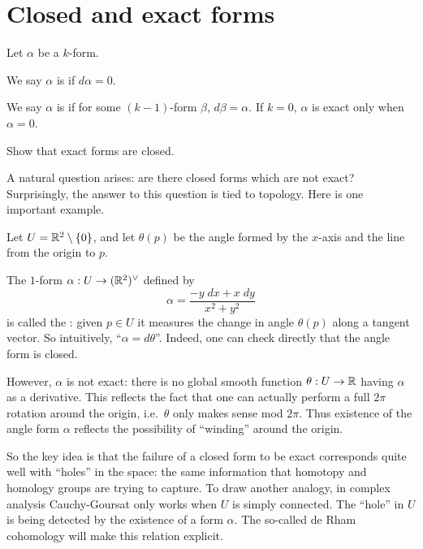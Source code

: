 \section{Closed and exact forms}
Let $\alpha$ be a $k$-form.
\begin{definition}
	We say $\alpha$ is  if $d\alpha = 0$.
\end{definition}
\begin{definition}
	We say $\alpha$ is  if for some $(k-1)$-form $\beta$,
	$d\beta = \alpha$.  If $k = 0$, $\alpha$ is exact only when $\alpha = 0$.
\end{definition}
\begin{ques}
	Show that exact forms are closed.
\end{ques}

A natural question arises: are there closed forms
which are not exact?
Surprisingly, the answer to this question is tied to topology.
Here is one important example.

\begin{example}
	\label{ex:angle_form}
	Let $U = \mathbb R^2 \setminus \{0\}$,
	and let $\theta(p)$ be the angle formed by the $x$-axis
	and the line from the origin to $p$.

	The $1$-form $\alpha : U \to (\mathbb R^2)^\vee$ defined by
	\[ \alpha = \frac{-y \; dx + x \; dy}{x^2+y^2} \]
	is called the :
	given $p \in U$ it measures the change in angle $\theta(p)$
	along a tangent vector.
	So intuitively, ``$\alpha = d\theta$''.
	Indeed, one can check directly that the angle form is closed.

	However, $\alpha$ is not exact: there is no global smooth
	function $\theta : U \to \mathbb R$ having $\alpha$ as a derivative.
	This reflects the fact that one can actually perform
	a full $2\pi$ rotation around the origin, i.e.\ $\theta$
	only makes sense mod $2\pi$.
	Thus existence of the angle form $\alpha$ reflects
	the possibility of ``winding'' around the origin.
\end{example}

So the key idea is that the failure of a closed form to be exact
corresponds quite well with ``holes'' in the space:
the same information that homotopy and homology groups are trying to capture.
To draw another analogy, in complex analysis Cauchy-Goursat
only works when $U$ is simply connected.
The ``hole'' in $U$ is being detected by the existence of a form $\alpha$.
The so-called de Rham cohomology will make this relation explicit.

